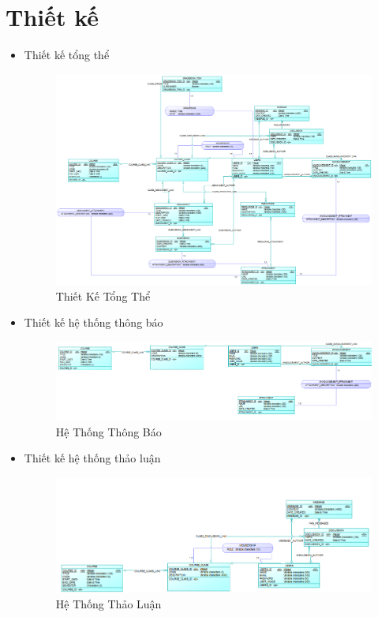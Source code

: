 \documentclass[12pt]{article}
\begin{document}
\newpage

\section{Thiết kế}
\begin{itemize}
\item Thiết kế tổng thể
\begin{figure}[H]
\centering
\includegraphics[scale = 0.9]{general.png}
\caption{Thiết Kế Tổng Thể}
\end{figure}

\item Thiết kế hệ thống thông báo
\begin{figure}[H]
\centering
\includegraphics[scale = 0.9]{noti.png}
\caption{Hệ Thống Thông Báo}
\end{figure}

\newpage

\item Thiết kế hệ thống thảo luận
\begin{figure}[H]
\centering
\includegraphics[scale = 0.9]{discuss.png}
\caption{Hệ Thống Thảo Luận}
\end{figure}


\end{itemize}
\end{document}

